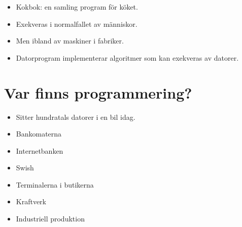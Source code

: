 \begin{frame}
  \begin{remark}
    \begin{itemize}
      \item Kokbok: en samling program för köket.
      \item Exekveras i normalfallet av människor.
      \item Men ibland av maskiner i fabriker.
    \end{itemize}
  \end{remark}

  \pause

  \begin{remark}
    \begin{itemize}
      \item Datorprogram implementerar algoritmer som kan exekveras av datorer.
    \end{itemize}
  \end{remark}
\end{frame}


\section[Var finns det?]{Var finns programmering?}


\begin{frame}
  \begin{example}[Fordon]
    \begin{itemize}
      \item Sitter hundratals datorer i en bil idag.
    \end{itemize}
  \end{example}

  \begin{example}
    \begin{itemize}
      \item Bankomaterna
      \item Internetbanken
      \item Swish
      \item Terminalerna i butikerna
    \end{itemize}
  \end{example}

  \begin{example}
    \begin{itemize}
      \item Kraftverk
      \item Industriell produktion
    \end{itemize}
  \end{example}
\end{frame}

